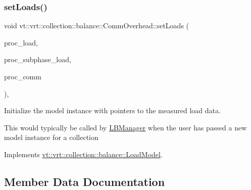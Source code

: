 \subsubsection{\texorpdfstring{set\+Loads()}{setLoads()}}
{\footnotesize\ttfamily void vt\+::vrt\+::collection\+::balance\+::\+Comm\+Overhead\+::set\+Loads (\begin{DoxyParamCaption}\item[{std\+::unordered\+\_\+map$<$ \hyperlink{namespacevt_a46ce6733d5cdbd735d561b7b4029f6d7}{Phase\+Type}, \hyperlink{namespacevt_1_1vrt_1_1collection_1_1balance_a824290c4323836ba7541a39845a200c3}{Load\+Map\+Type} $>$ const $\ast$}]{proc\+\_\+load,  }\item[{std\+::unordered\+\_\+map$<$ \hyperlink{namespacevt_a46ce6733d5cdbd735d561b7b4029f6d7}{Phase\+Type}, \hyperlink{namespacevt_1_1vrt_1_1collection_1_1balance_a8bdadb2583f128dd256e7d5a10826542}{Subphase\+Load\+Map\+Type} $>$ const $\ast$}]{proc\+\_\+subphase\+\_\+load,  }\item[{std\+::unordered\+\_\+map$<$ \hyperlink{namespacevt_a46ce6733d5cdbd735d561b7b4029f6d7}{Phase\+Type}, \hyperlink{namespacevt_1_1vrt_1_1collection_1_1balance_a10860c956804d644db54a16012352728}{Comm\+Map\+Type} $>$ const $\ast$}]{proc\+\_\+comm }\end{DoxyParamCaption})\hspace{0.3cm}{\ttfamily [override]}, {\ttfamily [virtual]}}



Initialize the model instance with pointers to the measured load data. 

This would typically be called by \hyperlink{structvt_1_1vrt_1_1collection_1_1balance_1_1_l_b_manager}{L\+B\+Manager} when the user has passed a new model instance for a collection 

Implements \hyperlink{classvt_1_1vrt_1_1collection_1_1balance_1_1_load_model_a621d040453688c70c168176b40cf90df}{vt\+::vrt\+::collection\+::balance\+::\+Load\+Model}.



\subsection{Member Data Documentation}
\mbox{\label{structvt_1_1vrt_1_1collection_1_1balance_1_1_comm_overhead_a35c4dcc20558f0f5092f9d5ab2e1a662}} 
